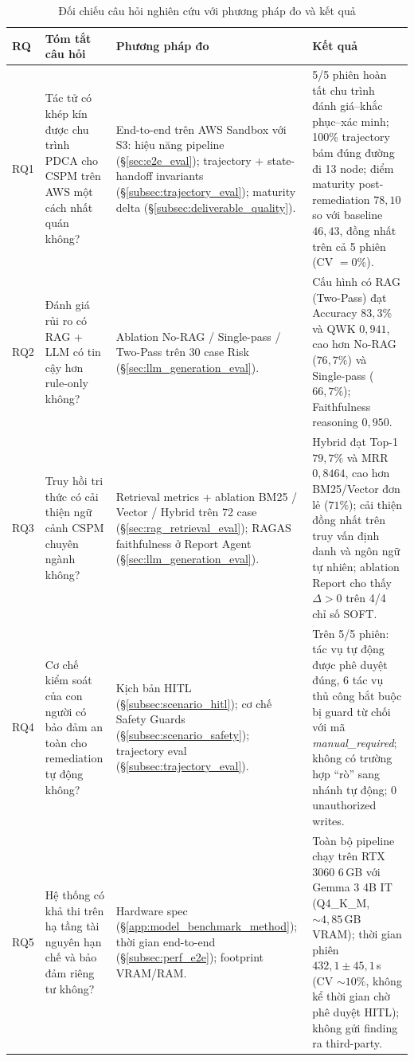 \begin{table}[!htb]
  \centering
  \caption{Đối chiếu câu hỏi nghiên cứu với phương pháp đo và kết quả}
  \label{tab:rq-verdict}
  \renewcommand{\arraystretch}{1.25}
  \footnotesize
  \begin{tabular}{|p{0.8cm}|p{4cm}|p{4.5cm}|p{4.5cm}|}
    \hline
    \textbf{RQ} & \textbf{Tóm tắt câu hỏi} & \textbf{Phương pháp đo} & \textbf{Kết quả} \\ \hline
    RQ1 & Tác tử có khép kín được chu trình PDCA cho CSPM trên AWS một cách nhất quán không? & End-to-end trên AWS Sandbox với S3: hiệu năng pipeline (§\ref{sec:e2e_eval}); trajectory + state-handoff invariants (§\ref{subsec:trajectory_eval}); maturity delta (§\ref{subsec:deliverable_quality}). & 5/5 phiên hoàn tất chu trình đánh giá--khắc phục--xác minh; 100\% trajectory bám đúng đường đi 13 node; điểm maturity post-remediation $78{,}10$ so với baseline $46{,}43$, đồng nhất trên cả 5 phiên (CV $= 0\%$). \\ \hline
    RQ2 & Đánh giá rủi ro có RAG + LLM có tin cậy hơn rule-only không? & Ablation No-RAG / Single-pass / Two-Pass trên 30 case Risk (§\ref{sec:llm_generation_eval}). & Cấu hình có RAG (Two-Pass) đạt Accuracy $83{,}3\%$ và QWK $0{,}941$, cao hơn No-RAG ($76{,}7\%$) và Single-pass ($66{,}7\%$); Faithfulness reasoning $0{,}950$. \\ \hline
    RQ3 & Truy hồi tri thức có cải thiện ngữ cảnh CSPM chuyên ngành không? & Retrieval metrics + ablation BM25 / Vector / Hybrid trên 72 case (§\ref{sec:rag_retrieval_eval}); RAGAS faithfulness ở Report Agent (§\ref{sec:llm_generation_eval}). & Hybrid đạt Top-1 $79{,}7\%$ và MRR $0{,}8464$, cao hơn BM25/Vector đơn lẻ ($71\%$); cải thiện đồng nhất trên truy vấn định danh và ngôn ngữ tự nhiên; ablation Report cho thấy $\Delta > 0$ trên 4/4 chỉ số SOFT. \\ \hline
    RQ4 & Cơ chế kiểm soát của con người có bảo đảm an toàn cho remediation tự động không? & Kịch bản HITL (§\ref{subsec:scenario_hitl}); cơ chế Safety Guards (§\ref{subsec:scenario_safety}); trajectory eval (§\ref{subsec:trajectory_eval}). & Trên 5/5 phiên: tác vụ tự động được phê duyệt đúng, 6 tác vụ thủ công bắt buộc bị guard từ chối với mã \textit{manual\_required}; không có trường hợp ``rò'' sang nhánh tự động; 0 unauthorized writes. \\ \hline
    RQ5 & Hệ thống có khả thi trên hạ tầng tài nguyên hạn chế và bảo đảm riêng tư không? & Hardware spec (§\ref{app:model_benchmark_method}); thời gian end-to-end (§\ref{subsec:perf_e2e}); footprint VRAM/RAM. & Toàn bộ pipeline chạy trên RTX 3060 6\,GB với Gemma 3 4B IT (Q4\_K\_M, $\sim 4{,}85$\,GB VRAM); thời gian phiên $432{,}1 \pm 45{,}1$\,s (CV $\sim 10\%$, không kể thời gian chờ phê duyệt HITL); không gửi finding ra third-party. \\ \hline
  \end{tabular}
\end{table}

